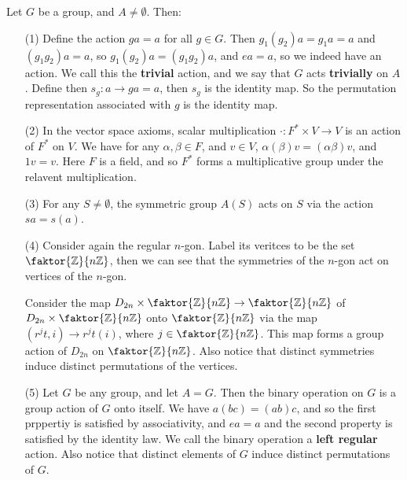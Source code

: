 \begin{example}\label{example_4.2}
  Let $G$ be a group, and  $A \neq \emptyset$. Then:

  \begin{enumerate}
    \item[(1)] Define the action $ga=a$ for all  $g \in G$. Then
      $g_1(g_2)a=g_1a=a$ and $(g_1g_2)a=a$, so $g_1(g_2)a=(g_1g_2)a$, and
      $ea=a$, so we indeed have an action. We call this the
      \textbf{trivial} action, and we say that $G$ acts
      \textbf{trivially} on $A$. Define then  $s_g:a \rightarrow
      ga=a$, then $s_g$ is the identity map. So the permutation
      representation associated with  $g$ is the identity map.

    \item[(2)] In the vector space axioms, scalar multiplication $\cdot:F^*
      \times V \rightarrow V$ is an action of $F^*$ on  $V$. We have for any
      $\alpha,\beta \in F$, and  $v \in V$,
      $\alpha(\beta)v=(\alpha\beta)v$, and $1v=v$. Here $F$ is a field,
      and so  $F^*$ forms a multiplicative group under the relavent
      multiplication.

    \item [(3)] For any $S \neq \emptyset$, the symmetric group  $A(S)$
      acts on $S$ via the action  $sa=s(a)$.

    \item[(4)] Consider again the regular $n$-gon. Label its veritces to be
      the set $\faktor{\Z}{n\Z}$, then we can see that the symmetries of
      the $n$-gon act on vertices of the $n$-gon.

      Consider the map $D_{2n} \times \faktor{\Z}{n\Z}\rightarrow
      \faktor{\Z}{n\Z}$ of $D_{2n} \times \faktor{\Z}{n\Z}$ onto
      $\faktor{\Z}{n\Z}$ via the map $(r^jt,i) \rightarrow r^jt(i)$,
      where $j \in \faktor{\Z}{n\Z}$. This map forms a group action of
      $D_{2n}$ on $\faktor{\Z}{n\Z}$. Also notice that distinct
      symmetries induce distinct permutations of the vertices.

    \item[(5)] Let $G$ be any group, and let  $A=G$. Then the binary
      operation on $G$ is a group action of  $G$ onto itself. We have
      $a(bc)=(ab)c$, and so the first prppertiy is satisfied by
      associativity, and $ea=a$ and the second property is satisfied by
      the identity law. We call the binary operation a \textbf{left
      regular} action. Also notice that distinct elements of $G$ induce
      distinct permutations of  $G$.
  \end{enumerate}
\end{example}

